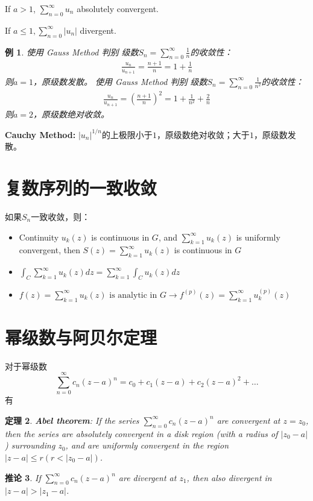 \documentclass[10pt, a4paper, oneside]{ctexbook}
\newtheorem{theorem}{定理}[section]
\newtheorem{corollary}[theorem]{推论}
\newtheorem{example}[theorem]{例}
\begin{document}
If $a>1$, $\displaystyle \sum_{n=0}^{\infty} u_{n}$ absolutely convergent. 

If $\displaystyle a \leq 1, \sum_{n=0}^{\infty}\left|u_{n}\right|$ divergent.

\begin{example}
    使用 {\rm Gauss Method} 判别 级数$\displaystyle S_n=\sum_{n=0}^\infty \frac{1}{n}$的收敛性：
    \begin{align*}
        \frac{u_n}{u_{n+1}}=\frac{n+1}{n}=1+\frac{1}{n}
    \end{align*}
    则$a=1$，原级数发散。
    \newline
    使用 {\rm Gauss Method} 判别 级数$\displaystyle S_n=\sum_{n=0}^\infty \frac{1}{n^2}$的收敛性：
    \begin{align*}
        \frac{u_n}{u_{n+1}}=\left(\frac{n+1}{n}\right)^2=1+\frac{1}{n^2}+\frac{2}{n}
    \end{align*}
    则$a=2$，原级数绝对收敛。
\end{example}

\textbf{Cauchy Method: }$\displaystyle |u_n|^{1/n}$的上极限小于$1$，原级数绝对收敛；大于$1$，原级数发散。

\section{复数序列的一致收敛}

如果$S_n$一致收敛，则：
\begin{itemize}
    \item Continuity $u_{k}(z)$ is continuous in $G$, and $\sum_{k=1}^{\infty} u_{k}(z)$ is uniformly convergent, then $S(z)=\sum_{k=1}^{\infty} u_{k}(z)$ is continuous in $G$
    \item $\displaystyle
    \int_{C} \sum_{k=1}^{\infty} u_{k}(z) d z=\sum_{k=1}^{\infty} \int_{C} u_{k}(z) d z
    $
    \item $\displaystyle
        f(z)=\sum_{k=1}^{\infty} u_{k}(z) \text { is analytic in } G \to
        f^{(p)}(z)=\sum_{k=1}^{\infty} u_{k}^{(p)}(z)
        $
\end{itemize}

\section{幂级数与阿贝尔定理}

对于幂级数
\begin{equation*}
    \sum_{n=0}^{\infty} c_{n}(z-a)^{n}=c_{0}+c_{1}(z-a)+c_{2}(z-a)^{2}+\ldots
\end{equation*} 有
\begin{theorem}\rm
    \textbf{Abel theorem}: If the series $\displaystyle \sum_{n=0}^{\infty} c_{n}(z-a)^{n}$ are convergent at $z=z_{0}$, then
the series are absolutely convergent in a disk region (with a radius of $\left|z_{0}-a\right|$ ) surrounding $z_{0}$, and are uniformly convergent in the region $|z-a| \leq r\left(r<\left|z_{0}-a\right|\right)$.
\end{theorem}
\begin{corollary}\rm
    If $\displaystyle \sum_{n=0}^{\infty} c_{n}(z-a)^{n}$ are divergent at $z_{1}$, then also divergent in $|z-a|>\left|z_{1}-a\right|$.
\end{corollary}
\end{document}
